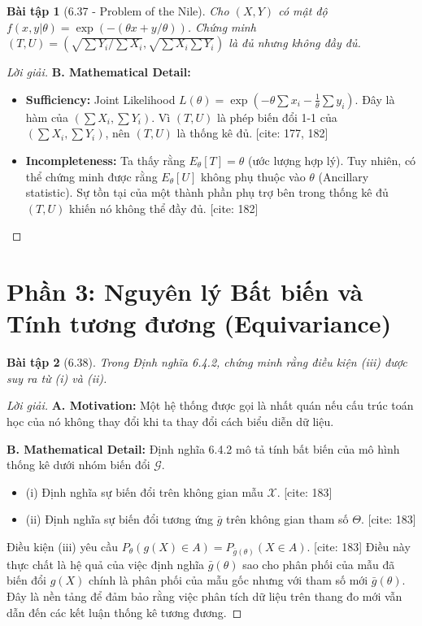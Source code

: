 \documentclass[8pt,a4paper]{article}
\newtheorem{exercise}{Bài tập}
\newenvironment{solution}{\begin{proof}[Lời giải]}{\end{proof}}
\begin{document}
\begin{exercise}[6.37 - Problem of the Nile]
Cho $(X, Y)$ có mật độ $f(x,y|\theta) = \exp(-(\theta x + y/\theta))$. Chứng minh $(T, U) = (\sqrt{\sum Y_i / \sum X_i}, \sqrt{\sum X_i \sum Y_i})$ là đủ nhưng không đầy đủ.
\end{exercise}

\begin{solution}
\textbf{B. Mathematical Detail:}
\begin{itemize}
    \item \textbf{Sufficiency:} Joint Likelihood $L(\theta) = \exp(-\theta \sum x_i - \frac{1}{\theta} \sum y_i)$. Đây là hàm của $(\sum X_i, \sum Y_i)$. Vì $(T, U)$ là phép biến đổi 1-1 của $(\sum X_i, \sum Y_i)$, nên $(T, U)$ là thống kê đủ. [cite: 177, 182]
    \item \textbf{Incompleteness:} Ta thấy rằng $E_\theta[T] = \theta$ (ước lượng hợp lý). Tuy nhiên, có thể chứng minh được rằng $E_\theta[U]$ không phụ thuộc vào $\theta$ (Ancillary statistic). Sự tồn tại của một thành phần phụ trợ bên trong thống kê đủ $(T, U)$ khiến nó không thể đầy đủ. [cite: 182]
\end{itemize}
\end{solution}

\section*{Phần 3: Nguyên lý Bất biến và Tính tương đương (Equivariance)}

\begin{exercise}[6.38]
Trong Định nghĩa 6.4.2, chứng minh rằng điều kiện (iii) được suy ra từ (i) và (ii).
\end{exercise}

\begin{solution}
\textbf{A. Motivation:} Một hệ thống được gọi là nhất quán nếu cấu trúc toán học của nó không thay đổi khi ta thay đổi cách biểu diễn dữ liệu. 

\textbf{B. Mathematical Detail:}
Định nghĩa 6.4.2 mô tả tính bất biến của mô hình thống kê dưới nhóm biến đổi $\mathcal{G}$. 
\begin{itemize}
    \item (i) Định nghĩa sự biến đổi trên không gian mẫu $\mathcal{X}$. [cite: 183]
    \item (ii) Định nghĩa sự biến đổi tương ứng $\bar{g}$ trên không gian tham số $\Theta$. [cite: 183]
\end{itemize}
Điều kiện (iii) yêu cầu $P_\theta(g(X) \in A) = P_{\bar{g}(\theta)}(X \in A)$. [cite: 183] Điều này thực chất là hệ quả của việc định nghĩa $\bar{g}(\theta)$ sao cho phân phối của mẫu đã biến đổi $g(X)$ chính là phân phối của mẫu gốc nhưng với tham số mới $\bar{g}(\theta)$. Đây là nền tảng để đảm bảo rằng việc phân tích dữ liệu trên thang đo mới vẫn dẫn đến các kết luận thống kê tương đương.
\end{solution}
\end{document}
